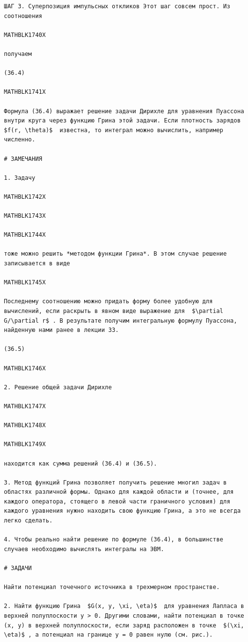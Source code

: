 \documentclass[
]{article}
\begin{document}
\begin{verbatim}
ШАГ 3. Суперпозиция импульсных откликов Этот шаг совсем прост. Из соотношения

MATHBLK1740X

получаем

(36.4) 

MATHBLK1741X

Формула (36.4) выражает решение задачи Дирихле для уравнения Пуассона внутри круга через функцию Грина этой задачи. Если плотность зарядов  $f(r, \theta)$  известна, то интеграл можно вычислить, например численно.

# ЗАМЕЧАНИЯ

1. Задачу

MATHBLK1742X

MATHBLK1743X

MATHBLK1744X

тоже можно решить *методом функции Грина*. В этом случае решение записывается в виде

MATHBLK1745X

Последнему соотношению можно придать форму более удобную для вычислений, если раскрыть в явном виде выражение для  $\partial G/\partial r$ . В результате получим интегральную формулу Пуассона, найденную нами ранее в лекции 33.

(36.5) 

MATHBLK1746X

2. Решение общей задачи Дирихле

MATHBLK1747X

MATHBLK1748X

MATHBLK1749X

находится как сумма решений (36.4) и (36.5).

3. Метод функций Грина позволяет получить решение многил задач в областях различной формы. Однако для каждой области и (точнее, для каждого оператора, стоящего в левой части граничного условия) для каждого уравнения нужно находить свою функцию Грина, а это не всегда легко сделать.

4. Чтобы реально найти решение по формуле (36.4), в большинстве случаев необходимо вычислять интегралы на ЭВМ.

# ЗАДАЧИ

Найти потенциал точечного источника в трехмерном пространстве.

2. Найти функцию Грина  $G(x, y, \xi, \eta)$  для уравнения Лапласа в верхней полуплоскости y > 0. Другими словами, найти потенциал в точке (x, y) в верхней полуплоскости, если заряд расположен в точке  $(\xi, \eta)$ , а потенциал на границе y = 0 равен нулю (см. рис.).


\end{verbatim}
\end{document}
